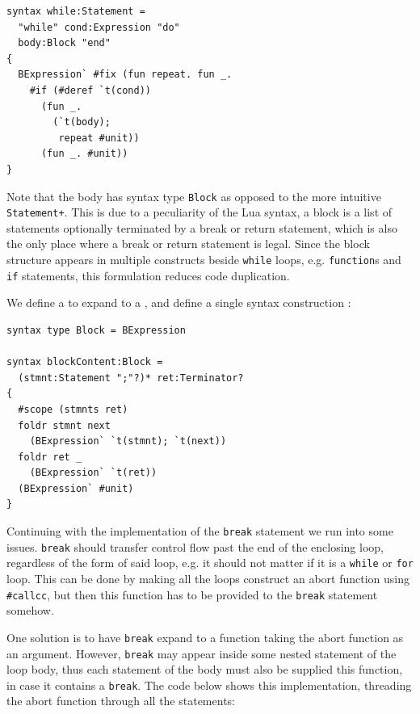 \documentclass{kththesis}
\begin{document}
\begin{verbatim}
syntax while:Statement =
  "while" cond:Expression "do"
  body:Block "end"
{
  BExpression` #fix (fun repeat. fun _.
    #if (#deref `t(cond))
      (fun _.
        (`t(body);
         repeat #unit))
      (fun _. #unit))
}
\end{verbatim}

Note that the body has syntax type \texttt{Block} as opposed to the more intuitive \texttt{Statement+}. This is due to a peculiarity of the Lua syntax, a block is a list of statements optionally terminated by a break or return statement, which is also the only place where a break or return statement is legal. Since the block structure appears in multiple constructs beside \texttt{while} loops, e.g. \texttt{function}s and \texttt{if} statements, this formulation reduces code duplication.

We define a  to expand to a , and define a single syntax construction :

\begin{verbatim}
syntax type Block = BExpression

syntax blockContent:Block =
  (stmnt:Statement ";"?)* ret:Terminator?
{
  #scope (stmnts ret)
  foldr stmnt next
    (BExpression` `t(stmnt); `t(next))
  foldr ret _
    (BExpression` `t(ret))
  (BExpression` #unit)
}
\end{verbatim}

Continuing with the implementation of the \texttt{break} statement we run into some issues. \texttt{break} should transfer control flow past the end of the enclosing loop, regardless of the form of said loop, e.g. it should not matter if it is a \texttt{while} or \texttt{for} loop. This can be done by making all the loops construct an abort function using \texttt{#callcc}, but then this function has to be provided to the \texttt{break} statement somehow.

One solution is to have \texttt{break} expand to a function taking the abort function as an argument. However, \texttt{break} may appear inside some nested statement of the loop body, thus each statement of the body must also be supplied this function, in case it contains a \texttt{break}. The code below shows this implementation, threading the abort function through all the statements:
\end{document}
